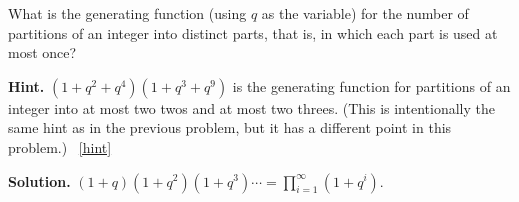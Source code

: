 \documentclass{book}
\begin{document}
\setcounter{project}{322}
\addtocounter{project}{-1}
\begin{activity}[]\label{activity-315}
\hypertarget{p-1614}{}%
What is the generating function (using \(q\) as the variable) for the number of partitions of an integer into distinct parts, that is, in which each part is used at most once?%
\par\smallskip%
\noindent\textbf{Hint.}\hypertarget{hint-213}{}\quad%
\hypertarget{p-1615}{}%
\((1 + q^2 + q^4 )(1 + q^3 + q^9 )\) is the generating function for partitions of an integer into at most two twos and at most two threes. (This is intentionally the same hint as in the previous problem, but it has a different point in this problem.)%
~\hfill{\tiny\hyperlink{a-322}{[hint]}\hypertarget{q-322}{}}\par\smallskip%
\noindent\textbf{Solution.}\hypertarget{solution-220}{}\quad%
\hypertarget{p-1616}{}%
\(\displaystyle (1+q)(1+q^2)(1+q^3)\cdots=
\prod_{i=1}^\infty(1+q^i)\).%
\end{activity}

\clearpage
\end{document}
